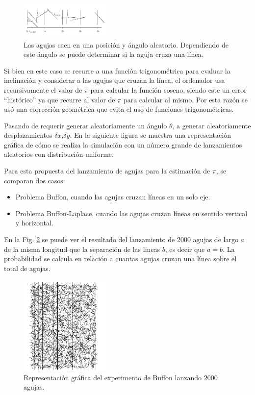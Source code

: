 \documentclass{rbf}
\begin{document}
\begin{figure}[tbp!]
 \centering
  \includegraphics[width=0.4\textwidth]{figures/agujas.jpg}
	\caption{Las agujas caen en una posición y ángulo aleatorio. Dependiendo de este ángulo se puede determinar si la aguja cruza una línea.\cite{krauth}}
 \label{aguja}
\end{figure}

Si bien en este caso se recurre a una función trigonométrica para evaluar la inclinación y considerar a las agujas que cruzan la línea, el ordenador usa recursivamente el valor de $\pi$ para calcular la función coseno, siendo este un error “histórico” ya que recurre al valor de $\pi$ para calcular al mismo. Por esta razón se usó una corrección geométrica que evita el uso de funciones trigonométricas.

Pasando de requerir generar aleatoriamente un ángulo $\theta$, a generar aleatoriamente desplazamientos $\delta x$,$\delta y$. En la siguiente figura se muestra una representación gráfica de cómo se realiza la simulación con un número grande de lanzamientos aleatorios con distribución uniforme. \cite{krauth}

Para esta propuesta del lanzamiento de agujas para la estimación de $\pi$, se comparan dos casos:

\begin{itemize}
    \item Problema Buffon, cuando las agujas cruzan líneas en un solo eje.
    \item Problema Buffon-Laplace, cuando las agujas cruzan líneas en sentido vertical y horizontal.
\end{itemize}



En la Fig. \ref{buff} se puede ver el resultado del lanzamiento de $2000$ agujas de largo $a$ de la misma longitud que la separación de las lineas $b$, es decir que $a=b$. La probabilidad se calcula en relación a cuantas agujas cruzan una línea sobre el total de agujas. 

\begin{figure}[tbp!]
 \centering
  \includegraphics[width=0.4\textwidth]{figures/buffon.jpg}
    \caption{Representación gráfica del experimento de Buffon lanzando $2000$ agujas.\cite{krauth}}
 \label{buff}
\end{figure}
\end{document}
